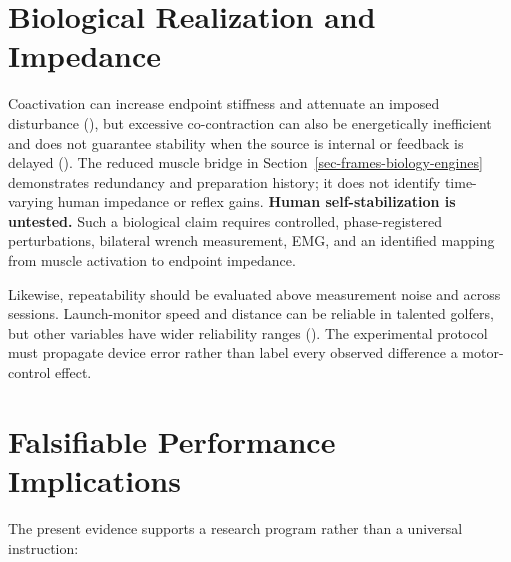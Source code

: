 \documentclass[
  letterpaper,
]{report}
\begin{document}
\section{Biological Realization and
Impedance}\label{biological-realization-and-impedance}

Coactivation can increase endpoint stiffness and attenuate an imposed
disturbance (),
but excessive co-contraction can also be energetically inefficient and
does not guarantee stability when the source is internal or feedback is
delayed (). The
reduced muscle bridge in Section~\ref{sec-frames-biology-engines}
demonstrates redundancy and preparation history; it does not identify
time-varying human impedance or reflex gains. \textbf{Human
self-stabilization is untested.} Such a biological claim requires
controlled, phase-registered perturbations, bilateral wrench
measurement, EMG, and an identified mapping from muscle activation to
endpoint impedance.

Likewise, repeatability should be evaluated above measurement noise and
across sessions. Launch-monitor speed and distance can be reliable in
talented golfers, but other variables have wider reliability ranges
(). The experimental protocol
must propagate device error rather than label every observed difference
a motor-control effect.

\section{Falsifiable Performance
Implications}\label{falsifiable-performance-implications}

The present evidence supports a research program rather than a universal
instruction:
\end{document}
